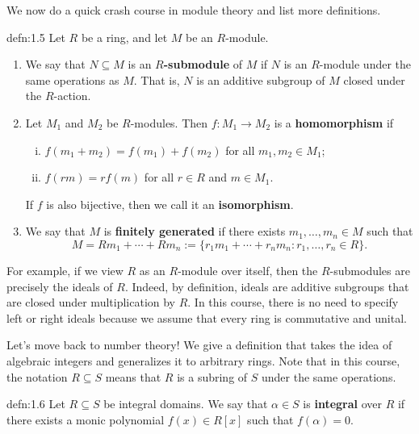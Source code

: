 We now do a quick crash course in module theory and list more definitions.

\begin{defn}{defn:1.5}
    Let $R$ be a ring, and let $M$ be an $R$-module.
    \begin{enumerate}[(1)]
        \item We say that $N \subseteq M$ is an {\bf $R$-submodule} of $M$ 
        if $N$ is an $R$-module under the same operations as $M$. That is, 
        $N$ is an additive subgroup of $M$ closed under the $R$-action. 

        \item Let $M_1$ and $M_2$ be $R$-modules. Then $f : M_1 \to M_2$ 
        is a {\bf homomorphism} if 
        \begin{enumerate}[(i)]
            \item $f(m_1 + m_2) = f(m_1) + f(m_2)$ for all $m_1, m_2 \in M_1$; 
            \item $f(rm) = rf(m)$ for all $r \in R$ and $m \in M_1$. 
        \end{enumerate}
        If $f$ is also bijective, then we call it an {\bf isomorphism}. 
        
        \item We say that $M$ is {\bf finitely generated} if there exists 
        $m_1, \dots, m_n \in M$ such that 
        \[ M = Rm_1 + \cdots + Rm_n := \{r_1 m_1 + 
        \cdots + r_n m_n : r_1, \dots, r_n \in R\}. \] 
    \end{enumerate}
\end{defn}

For example, if we view $R$ as an $R$-module over itself, then the $R$-submodules 
are precisely the ideals of $R$. Indeed, by definition, ideals are 
additive subgroups that are closed under multiplication by $R$. In this course, 
there is no need to specify left or right ideals because we assume that every 
ring is commutative and unital.

Let's move back to number theory! We give a definition that takes the idea of 
algebraic integers and generalizes it to arbitrary rings. Note that 
in this course, the notation $R \subseteq S$ means that $R$ is a subring of $S$ 
under the same operations. 

\begin{defn}{defn:1.6}
    Let $R \subseteq S$ be integral domains. We say that $\alpha \in S$ 
    is {\bf integral} over $R$ if there exists a monic polynomial 
    $f(x) \in R[x]$ such that $f(\alpha) = 0$.
\end{defn}

